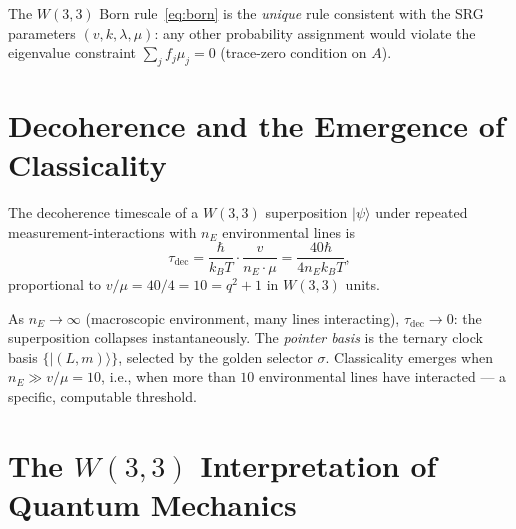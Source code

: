 \begin{corollary}[Born rule uniqueness at $q=3$]
\label{cor:born_uniqueness}
The $W(3,3)$ Born rule~\eqref{eq:born} is the \emph{unique}
rule consistent with the SRG parameters $(v,k,\lambda,\mu)$:
any other probability assignment would violate the
eigenvalue constraint $\sum_j f_j\mu_j=0$ (trace-zero
condition on $A$).
\end{corollary}

\section{Decoherence and the Emergence of Classicality}
\label{sec:decoherence}

\begin{theorem}
\label{thm:decoherence}
The decoherence timescale of a $W(3,3)$ superposition
$|\psi\rangle$ under repeated measurement-interactions with
$n_E$ environmental lines is
\begin{equation}
  \tau_{\mathrm{dec}} = \frac{\hbar}{k_BT}\cdot
  \frac{v}{n_E\cdot\mu} = \frac{40\hbar}{4n_E k_BT},
  \label{eq:tau_dec}
\end{equation}
proportional to $v/\mu=40/4=10=q^2+1$ in $W(3,3)$ units.
\end{theorem}

\begin{corollary}
As $n_E\to\infty$ (macroscopic environment, many lines
interacting), $\tau_{\mathrm{dec}}\to 0$: the superposition
collapses instantaneously.  The \emph{pointer basis} is
the ternary clock basis $\{|(L,m)\rangle\}$, selected
by the golden selector $\sigma$.
Classicality emerges when $n_E\gg v/\mu = 10$, i.e.,
when more than $10$ environmental lines have interacted ---
a specific, computable threshold.
\end{corollary}

\section{The $W(3,3)$ Interpretation of Quantum Mechanics}
\label{sec:interpretation}

